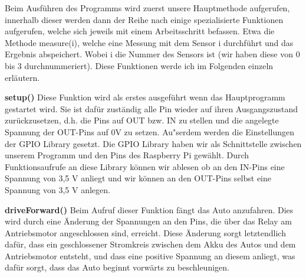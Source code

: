 \documentclass[a4paper,12pt]{article}
\begin{document}
\medskip

Beim Ausf\"uhren des Programms wird zuerst unsere Hauptmethode aufgerufen, innerhalb dieser werden dann der Reihe nach einige spezialisierte Funktionen aufgerufen, welche sich jeweils mit einem Arbeitsschritt befassen.
Etwa die Methode measure(i), welche eine Messung mit dem Sensor i durchf\"uhrt und das Ergebnis abspeichert.
Wobei i die Nummer des Sensors ist (wir haben diese von 0 bis 3 durchnummeriert).
Diese Funktionen werde ich im Folgenden einzeln erl\"autern.

\medskip

\textbf{setup()}
\newline
Diese Funktion wird als erstes ausgef\"uhrt wenn das Hauptprogramm gestartet wird.
Sie ist daf\"ur zust\"andig alle Pin wieder auf ihren Ausgangszustand zur\"uckzusetzen, d.h. die Pins auf OUT bzw. IN zu stellen und die angelegte Spannung der OUT-Pins auf 0V zu setzen.
Au"serdem werden die Einstellungen der GPIO Library gesetzt.
Die GPIO Library haben wir als Schnittstelle zwischen unserem Programm und den Pins des Raspberry Pi gew\"ahlt.
Durch Funktionsaufrufe an diese Library k\"onnen wir ablesen ob an den IN-Pins eine Spannung von 3,5 V anliegt und wir k\"onnen an den OUT-Pins selbst eine Spannung von 3,5 V anlegen.

\medskip

\textbf{driveForward()}
\newline
Beim Aufruf dieser Funktion f\"angt das Auto anzufahren.
Dies wird durch eine \"Anderung der Spannungen an den Pins, die \"uber das Relay am Antriebsmotor angeschlossen sind, erreicht.
Diese \"Anderung sorgt letztendlich daf\"ur, dass ein geschlossener Stromkreis zwischen dem Akku des Autos und dem Antriebsmotor entsteht, und dass eine positive Spannung an
diesem anliegt, was daf\"ur sorgt, dass das Auto beginnt vorw\"arts zu beschleunigen.

\medskip
\end{document}

